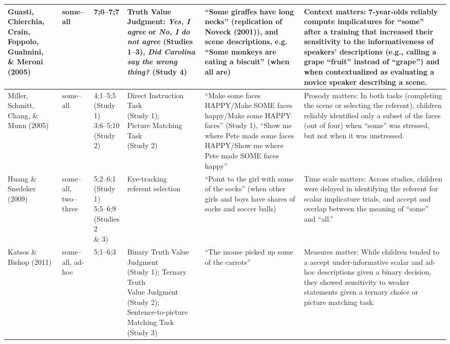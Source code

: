 \documentclass[man]{apa2}
\begin{document}
{\begin{landscape}
\begin{table}[!ht]
\begin{tabular}{| p{2.2cm} | p{2cm} | p{1.69cm} | p{4.5cm} | p{5cm} | p{7.2cm} |}
\parbox[t]{2.2cm}{Guasti, Chierchia, Crain, Foppolo, Gualmini,\\\& Meroni (2005)} & some--all & 7;0--7;7 & Truth Value Judgment: \textit{Yes, I agree} or \textit{No, I do not agree} (Studies 1--3), \textit{Did Carolina say the wrong thing?} (Study 4) & ``Some giraffes have long necks'' (replication of Noveck (2001)), and scene descriptions, e.g. ``Some monkeys are eating a biscuit'' (when all are) & Context matters: 7-year-olds reliably compute implicatures for ``some'' after a training that increased their sensitivity to the informativeness of speakers' descriptions (e.g., calling a grape ``fruit'' instead of ``grape'') and when contextualized as evaluating a novice speaker describing a scene.\\ \hline
Miller, Schmitt, Chang, \& Munn (2005) & some--all & \parbox[t]{1.69cm}{4;1--5;5\\(Study 1)\\ 3;6--5;10\\(Study 2)} & \parbox[t]{4.5cm}{Direct Instruction Task\\(Study 1);\\Picture Matching Task\\(Study 2)} & ``Make some faces HAPPY/Make SOME faces happy/Make some HAPPY faces'' (Study 1), ``Show me where Pete made some faces HAPPY/Show me where Pete made SOME faces happy'' & Prosody matters: In both tasks (completing the scene or selecting the referent), children reliably identified only a subset of the faces (out of four) when ``some'' was stressed, but not when it was unstressed.\\ \hline
\parbox[t]{2.2cm}{Huang \&\\Snedeker (2009)} & \parbox[t]{2cm}{some--all,\\two--three} &\parbox[t]{1.69cm}{5;2--6;1\\(Study 1)\\5;5--6;9 \\(Studies 2\\\& 3)} & \parbox[t]{4.5cm}{Eye-tracking\\referent selection} & ``Point to the girl with some of the socks'' (when other girls and boys have shares of socks and soccer balls) & Time scale matters: Across studies, children were delayed in identifying the referent for scalar implicature trials, and accept and overlap between the meaning of ``some'' and ``all.'' \\ \hline
Katsos \& Bishop (2011) & some--all, ad-hoc & 5;1--6;3  & \parbox[t]{4.5cm}{Binary Truth Value Judgment\\(Study 1); Ternary Truth\\Value Judgment (Study 2);\\Sentence-to-picture Matching Task\\(Study 3)} & ``The mouse picked up some of the carrots'' & Measures matter: While children tended to a accept under-informative scalar and ad-hoc descriptions given a binary decision, they showed sensitivity to weaker statements given a ternary choice or picture matching task. \\ \hline

\end{tabular}
\end{table}
\end{landscape}}
\end{document}
